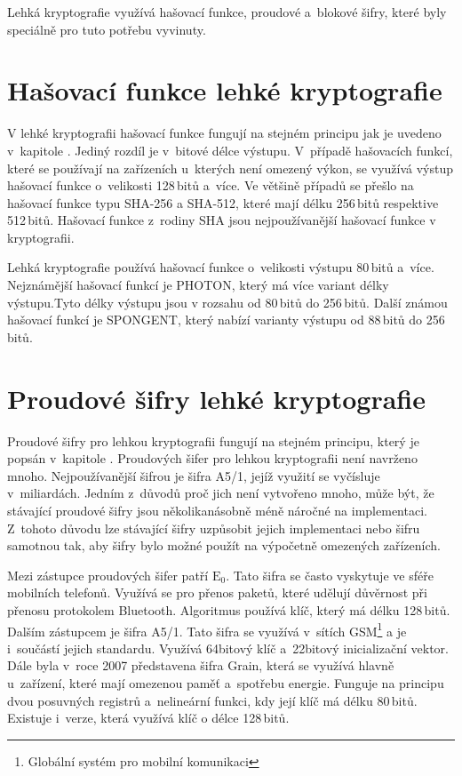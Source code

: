 Lehká kryptografie využívá hašovací funkce, proudové a~blokové šifry, které byly speciálně pro tuto potřebu vyvinuty.\cite{Klima}


\section{Hašovací funkce lehké kryptografie}
V lehké kryptografii hašovací funkce fungují na stejném principu jak je uvedeno v~kapitole . Jediný rozdíl je v~bitové délce výstupu. V~případě hašovacích funkcí, které se používají na zařízeních u~kterých není omezený výkon, se využívá výstup hašovací funkce o~velikosti 128\,bitů a~více. Ve většině případů se přešlo na hašovací funkce typu SHA-256 a SHA-512, které mají délku 256\,bitů respektive 512\,bitů. Hašovací funkce z~rodiny SHA jsou nejpoužívanější hašovací funkce v kryptografii. 

Lehká kryptografie používá hašovací funkce o~velikosti výstupu 80\,bitů a~více. Nejznámější hašovací funkcí je PHOTON, který má více variant délky výstupu.Tyto délky výstupu jsou v rozsahu od 80\,bitů do 256\,bitů. Další známou hašovací funkcí je SPONGENT, který nabízí varianty výstupu od 88\,bitů do 256\,bitů.\cite{LightHash}

\section{Proudové šifry lehké kryptografie}
Proudové šifry pro lehkou kryptografii fungují na stejném principu, který je popsán v~kapitole . Proudových šifer pro lehkou kryptografii není navrženo mnoho. Nejpoužívanější šifrou je šifra A5/1, jejíž využití se vyčísluje v~miliardách. Jedním z~důvodů proč jich není vytvořeno mnoho, může být, že stávající proudové šifry jsou několikanásobně méně náročné na implementaci. Z~tohoto důvodu lze stávající šifry uzpůsobit jejich implementaci nebo šifru samotnou tak, aby šifry bylo možné použít na výpočetně omezených zařízeních.\cite{SaldaBP}

Mezi zástupce proudových šifer patří $\mathrm{E_0}$. Tato šifra se často vyskytuje ve sféře mobilních telefonů. Využívá se pro přenos paketů, které udělují důvěrnost při přenosu protokolem Bluetooth. Algoritmus používá klíč, který má délku 128\,bitů. Dalším zástupcem je šifra A5/1. Tato šifra se využívá v~sítích GSM\footnote{Globální systém pro mobilní komunikaci} a je i~součástí jejich standardu. Využívá 64bitový klíč a~22bitový inicializační vektor. Dále byla v~roce 2007 představena šifra Grain, která se využívá hlavně u~zařízení, které mají omezenou paměť a~spotřebu energie. Funguje na principu dvou posuvných registrů a~nelineární funkci, kdy její klíč má délku 80\,bitů. Existuje i~verze, která využívá klíč o délce 128\,bitů.\cite{SaldaBP}


